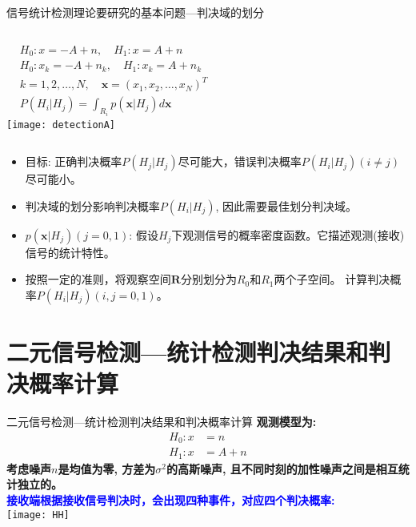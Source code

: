 \begin{frame}{信号统计检测理论要研究的基本问题---判决域的划分}
\begin{columns}
	\begin{align*}
	&H_0: x=-A+n,\quad H_1: x=A+n\\
	&H_0: x_k=-A+n_k,\quad H_1: x_k=A+n_k\\
	&k=1,2,\dots,N,\quad \bm{x}=(x_1,x_2,\dots,x_N)^{T}\\
	&P(H_i|H_j)=\int_{R_i}p(\bm{x}|H_j)d\bm{x}
	\end{align*}
	\texttt{[image: detectionA]}
\end{columns}
\begin{itemize}
	\item 目标: 正确判决概率$P(H_j|H_j)$尽可能大，错误判决概率$P(H_i|H_j)(i\ne j)$尽可能小。
	\item 判决域的划分影响判决概率$P(H_i|H_j)$, 因此需要最佳划分判决域。
	\item $p(\bm{x}|H_j)(j=0,1)$: 假设$H_j$下观测信号的概率密度函数。它描述观测(接收)信号的统计特性。
	\item 按照一定的准则，将观察空间$\bm{R}$分别划分为$R_0$和$R_1$两个子空间。
	计算判决概率$P(H_i|H_j)(i,j=0,1)$。	
\end{itemize}
\end{frame}

\section{二元信号检测---统计检测判决结果和判决概率计算}

\begin{frame}{二元信号检测---统计检测判决结果和判决概率计算}
	\textbf{观测模型为:}
	\begin{align*}
	H_0: x&=n\\
	H_1: x&=A+n
	\end{align*}
	\textbf{考虑噪声$n$是均值为零, 方差为$\sigma^2$的高斯噪声, 且不同时刻的加性噪声之间是相互统计独立的。}\\
	\textcolor{blue}{\textbf{接收端根据接收信号判决时，会出现四种事件，对应四个判决概率:}}\\
	\centering
	\texttt{[image: HH]}
\end{frame}


